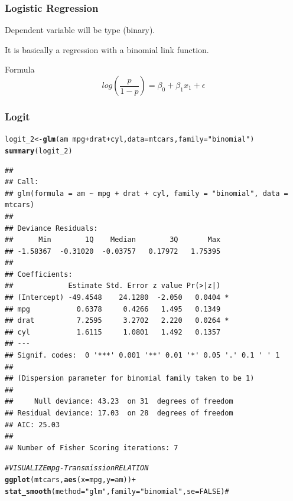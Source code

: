 \documentclass{beamer}\usepackage[]{graphicx}\usepackage[]{color}
\makeatletter
\newcommand{\hlnum}[1]{\textcolor[rgb]{0.686,0.059,0.569}{#1}}%
\newcommand{\hlstr}[1]{\textcolor[rgb]{0.192,0.494,0.8}{#1}}%
\newcommand{\hlcom}[1]{\textcolor[rgb]{0.678,0.584,0.686}{\textit{#1}}}%
\newcommand{\hlopt}[1]{\textcolor[rgb]{0,0,0}{#1}}%
\newcommand{\hlstd}[1]{\textcolor[rgb]{0.345,0.345,0.345}{#1}}%
\newcommand{\hlkwb}[1]{\textcolor[rgb]{0.69,0.353,0.396}{#1}}%
\newcommand{\hlkwc}[1]{\textcolor[rgb]{0.333,0.667,0.333}{#1}}%
\newcommand{\hlkwd}[1]{\textcolor[rgb]{0.737,0.353,0.396}{\textbf{#1}}}%
\newenvironment{kframe}{%
 \def\at@end@of@kframe{}%
 \ifinner\ifhmode%
  \def\at@end@of@kframe{\end{minipage}}%
  \begin{minipage}{\columnwidth}%
 \fi\fi%
 \def\FrameCommand##1{\hskip\@totalleftmargin \hskip-\fboxsep
 \colorbox{shadecolor}{##1}\hskip-\fboxsep
     \hskip-\linewidth \hskip-\@totalleftmargin \hskip\columnwidth}%
 \MakeFramed {\advance\hsize-\width
   \@totalleftmargin\z@ \linewidth\hsize
   \@setminipage}}%
 {\par\unskip\endMakeFramed%
 \at@end@of@kframe}
\newenvironment{knitrout}{}{} %
\makeatother
\begin{document}
\begin{frame}
\frametitle{Logistic Regression}

Dependent variable will be type (binary). \vfill

It is basically a regression with a binomial link function. \vfill

\begin{alertblock}{Formula}
\[
log \left(\frac{p}{1-p} \right) = \beta_0 + \beta_1 x_1 + \epsilon
\]
\end{alertblock}

\end{frame}


\begin{frame}
\frametitle{Logit}


\begin{knitrout}\tiny
{}\color{fgcolor}\begin{kframe}
\begin{alltt}
\hlstd{logit_2} \hlkwb{<-} \hlkwd{glm}\hlstd{(am} \hlopt{~} \hlstd{mpg} \hlopt{+} \hlstd{drat} \hlopt{+} \hlstd{cyl,} \hlkwc{data} \hlstd{= mtcars,} \hlkwc{family} \hlstd{=} \hlstr{"binomial"}\hlstd{)}
\hlkwd{summary}\hlstd{(logit_2)}
\end{alltt}
\begin{verbatim}
## 
## Call:
## glm(formula = am ~ mpg + drat + cyl, family = "binomial", data = mtcars)
## 
## Deviance Residuals: 
##      Min        1Q    Median        3Q       Max  
## -1.58367  -0.31020  -0.03757   0.17972   1.75395  
## 
## Coefficients:
##             Estimate Std. Error z value Pr(>|z|)  
## (Intercept) -49.4548    24.1280  -2.050   0.0404 *
## mpg           0.6378     0.4266   1.495   0.1349  
## drat          7.2595     3.2702   2.220   0.0264 *
## cyl           1.6115     1.0801   1.492   0.1357  
## ---
## Signif. codes:  0 '***' 0.001 '**' 0.01 '*' 0.05 '.' 0.1 ' ' 1
## 
## (Dispersion parameter for binomial family taken to be 1)
## 
##     Null deviance: 43.23  on 31  degrees of freedom
## Residual deviance: 17.03  on 28  degrees of freedom
## AIC: 25.03
## 
## Number of Fisher Scoring iterations: 7
\end{verbatim}
\end{kframe}
\end{knitrout}

\begin{knitrout}\scriptsize
{}\color{fgcolor}\begin{kframe}
\begin{alltt}
\hlcom{# VISUALIZE mpg - Transmission RELATION}
\hlkwd{ggplot}\hlstd{(mtcars,} \hlkwd{aes}\hlstd{(}\hlkwc{x} \hlstd{= mpg,} \hlkwc{y} \hlstd{= am))} \hlopt{+}
        \hlkwd{stat_smooth}\hlstd{(}\hlkwc{method}\hlstd{=}\hlstr{"glm"}\hlstd{,} \hlkwc{family}\hlstd{=}\hlstr{"binomial"}\hlstd{,} \hlkwc{se}\hlstd{=}\hlnum{FALSE}\hlstd{)} \hlcom{#}
\end{alltt}
\end{kframe}


\end{knitrout}
\end{frame}
\end{document}

